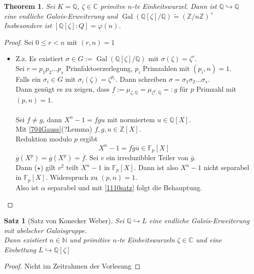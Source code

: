\documentclass[10pt,a4paper]{article}
\newcommand{\N}{\ensuremath{\mathbb{N}}}
\newcommand{\Z}{\ensuremath{\mathbb{Z}}}
\newcommand{\Q}{\ensuremath{\mathbb{Q}}}
\newcommand{\C}{\ensuremath{\mathbb{C}}}
\newcommand{\F}{\ensuremath{\mathbb{F}}}
\newcommand{\al}{\ensuremath{\alpha}}
\newcommand{\ol}[1]{\overline{#1}}
\newcommand{\isomorph}{\ensuremath{\tilde{=}}}
\newcommand{\Gal}{\ensuremath{\operatorname{Gal}}}
\newcounter{thm}[section]
\theoremstyle{definition}
\theoremstyle{plain}
\newtheorem{satz}[thm]{Satz}
\newtheorem{theorem}[thm]{Theorem}
\theoremstyle{remark}
\begin{document}
\begin{theorem}\label{1111th}
	Sei $K=\Q$, $\zeta\in\C$ primitve $n$-te Einheitswurzel. Dann ist $\Q\hookrightarrow\Q$ eine endliche Galois-Erweiterung und $\Gal(\Q[\zeta]/\Q)\isomorph(\Z/n\Z)^\times$\\
	Insbesondere ist $[\Q[\zeta]:Q]=\varphi(n)$.
\end{theorem}
\begin{proof}
	Sei $0\leq r<n$ mit $(r,n)=1$
	\begin{itemize}
		\item Z.z. Es existiert $\sigma\in G:=\Gal(\Q[\zeta]/\Q)$ mit $\sigma(\zeta)=\zeta^r$.\\
		Sei $r=p_1p_2...p_s$ Primfaktoerzerlegung, $p_i$ Primzahlen mit $(p_i,n)=1$.\\
		Falls ein $\sigma_i\in G$ mit $\sigma_i(\zeta)=\zeta^{p_i}$. Dann schreiben $\sigma=\sigma_1\sigma_2...\sigma_s$.\\
		Dann genügt es zu zeigen, dass $f:=\mu_{\zeta,\Q}=\mu_{\zeta^p,\Q}=:g$ für $p$ Primzahl mit $(p,n)=1$.\\
		\\
		Sei $f\neq g$, dann $X^n-1=fgu$ mit normiertem $u\in\Q[X]$. \\
		Mit \ref{704Gauss}(?Lemma) $f,g,u\in\Z[X]$.\\
		Reduktion modulo $p$ ergibt
		\[X^n-1=\ol f\ol g\ol u\in\F_p[X]\] %
		$\ol g(X^p)=\ol g(X^p)=\ol f$. Sei $v$ ein irreduzibbler Teiler von $\ol g$.\\
		Dann ($\star$) gilt $v^2$ teilt $X^n-1$ in $\F_p[X]$. Dann ist also $X^n-1$ nicht separabel in $\F_p[X]$. Widerspruch zu $(p,n)=1$.\\
		Also ist $\al$ separabel und mit \ref{1110satz} folgt die Behauptung.
		
	\end{itemize}
\end{proof}


\begin{satz}[Satz von Konecker Weber]\label{1112kronweb}
	Sei $\Q\hookrightarrow L$ eine endliche Galois-Erweiterung mit abelscher Galoisgruppe.\\
	Dann existiert $n\in\N$ und primitive $n$-te Einheitswurzeln $\zeta\in\C$ und eine Einbettung $L\hookrightarrow\Q[\zeta]$
\end{satz}
\begin{proof}
	Nicht im Zeitrahmen der Vorlesung
\end{proof}
\end{document}
